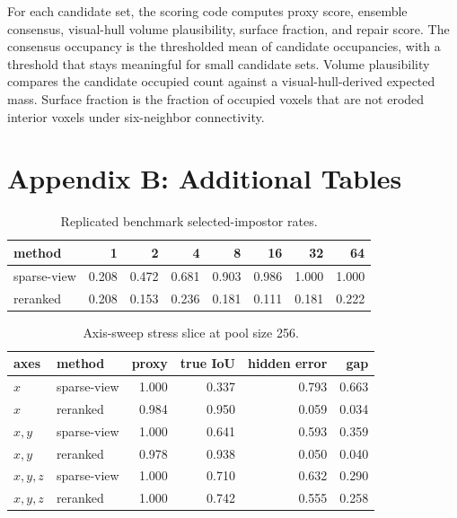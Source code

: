 \documentclass{article}
\begin{document}
For each candidate set, the scoring code computes proxy score, ensemble
consensus, visual-hull volume plausibility, surface fraction, and repair score.
The consensus occupancy is the thresholded mean of candidate occupancies, with
a threshold that stays meaningful for small candidate sets. Volume plausibility
compares the candidate occupied count against a visual-hull-derived expected
mass. Surface fraction is the fraction of occupied voxels that are not eroded
interior voxels under six-neighbor connectivity.

\section{Appendix B: Additional Tables}

\begin{table}[t]
\centering
\caption{Replicated benchmark selected-impostor rates.}
\label{tab:rates}
\begin{tabular}{lrrrrrrr}
\toprule
method & 1 & 2 & 4 & 8 & 16 & 32 & 64 \\
\midrule
sparse-view & 0.208 & 0.472 & 0.681 & 0.903 & 0.986 & 1.000 & 1.000 \\
reranked & 0.208 & 0.153 & 0.236 & 0.181 & 0.111 & 0.181 & 0.222 \\
\bottomrule
\end{tabular}
\end{table}

\begin{table}[t]
\centering
\caption{Axis-sweep stress slice at pool size 256.}
\label{tab:axis}
\begin{tabular}{llrrrr}
\toprule
axes & method & proxy & true IoU & hidden error & gap \\
\midrule
$x$ & sparse-view & 1.000 & 0.337 & 0.793 & 0.663 \\
$x$ & reranked & 0.984 & 0.950 & 0.059 & 0.034 \\
$x,y$ & sparse-view & 1.000 & 0.641 & 0.593 & 0.359 \\
$x,y$ & reranked & 0.978 & 0.938 & 0.050 & 0.040 \\
$x,y,z$ & sparse-view & 1.000 & 0.710 & 0.632 & 0.290 \\
$x,y,z$ & reranked & 1.000 & 0.742 & 0.555 & 0.258 \\
\bottomrule
\end{tabular}
\end{table}
\end{document}
